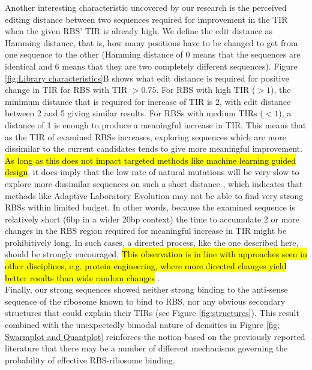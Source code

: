 \documentclass{article}
\begin{document}
Another interesting characteristic uncovered by our research is the perceived editing distance between two sequences required for  improvement in the TIR when the given RBS' TIR is already high.
We define the edit distance as Hamming distance, that is, how many positions have to be changed to get from one sequence to the other (Hamming distance of 0 means that the sequences are identical and 6 means that they are two completely different sequences).
Figure \ref{fig:Library characteristics}B shows what edit distance is required for positive change in TIR for RBS with TIR $>0.75$.
For RBS with high TIR ($>1$), the minimum distance that is required for increase of TIR is 2, with edit distance between 2 and 5 giving similar results.
For RBSs with medium TIRs ($<1$), a distance of 1 is enough to produce a meaningful increase in TIR.
This means that as the TIR of examined RBSs increases, exploring sequences which are more dissimilar to the current candidates tends to give more meaningful improvement.
\hl{As long as this does not impact targeted methods like machine learning guided design}, it does imply that the low rate of natural mutations will be very slow to explore more dissimilar sequences on such a short distance \cite{Lee2012}, which indicates that methods like Adaptive Laboratory Evolution may not be able to find very strong RBSs within limited budget.
In other words, because the examined sequence is relatively short (6bp in a wider 20bp context) the time to accumulate 2 or more changes in the RBS region required for meaningful increase in TIR might be prohibitively long.
In such cases, a directed process, like the one described here, should be strongly encouraged.
\hl{This observation is in line with approaches seen in other disciplines, e.g. protein engineering, where more directed changes yield better results than wide random changes} \cite{Jackel2008}.\\

Finally, our strong sequences showed neither strong binding to the anti-sense sequence of the ribosome known to bind to RBS, nor any obvious secondary structures that could explain their TIRs (see Figure \ref{fig:structures}).
This result combined with the unexpectedly bimodal nature of densities in Figure \ref{fig: Swarmplot and Quantplot} reinforces the notion based on the previously reported literature \cite{Saito2020,EspahBorujeni2016} that there may be a number of different mechanisms governing the probability of effective RBS-ribosome binding.\\
\end{document}
